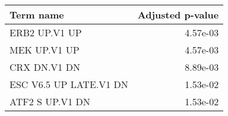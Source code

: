 \begin{tabular}{lr}
\toprule
             Term name &  Adjusted p-value \\
\midrule
         ERB2 UP.V1 UP &          4.57e-03 \\
          MEK UP.V1 UP &          4.57e-03 \\
          CRX DN.V1 DN &          8.89e-03 \\
ESC V6.5 UP LATE.V1 DN &          1.53e-02 \\
       ATF2 S UP.V1 DN &          1.53e-02 \\
\bottomrule
\end{tabular}
